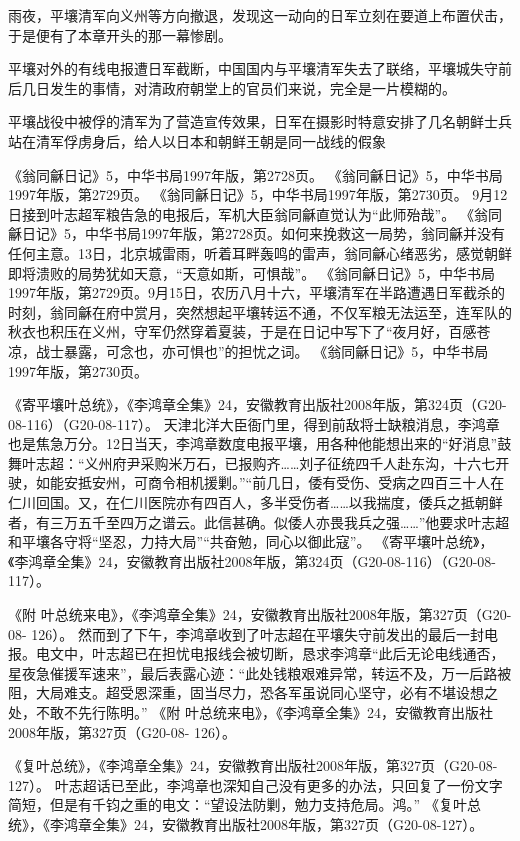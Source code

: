 \documentclass[12pt,UTF8]{ctexbook}
\begin{document}
雨夜，平壤清军向义州等方向撤退，发现这一动向的日军立刻在要道上布置伏击，于是便有了本章开头的那一幕惨剧。

平壤对外的有线电报遭日军截断，中国国内与平壤清军失去了联络，平壤城失守前后几日发生的事情，对清政府朝堂上的官员们来说，完全是一片模糊的。


平壤战役中被俘的清军为了营造宣传效果，日军在摄影时特意安排了几名朝鲜士兵站在清军俘虏身后，给人以日本和朝鲜王朝是同一战线的假象

《翁同龢日记》5，中华书局1997年版，第2728页。
《翁同龢日记》5，中华书局1997年版，第2729页。
《翁同龢日记》5，中华书局1997年版，第2730页。
9月12日接到叶志超军粮告急的电报后，军机大臣翁同龢直觉认为“此师殆哉”。 《翁同龢日记》5，中华书局1997年版，第2728页。如何来挽救这一局势，翁同龢并没有任何主意。13日，北京城雷雨，听着耳畔轰鸣的雷声，翁同龢心绪恶劣，感觉朝鲜即将溃败的局势犹如天意，“天意如斯，可惧哉”。 《翁同龢日记》5，中华书局1997年版，第2729页。9月15日，农历八月十六，平壤清军在半路遭遇日军截杀的时刻，翁同龢在府中赏月，突然想起平壤转运不通，不仅军粮无法运至，连军队的秋衣也积压在义州，守军仍然穿着夏装，于是在日记中写下了“夜月好，百感苍凉，战士暴露，可念也，亦可惧也”的担忧之词。 《翁同龢日记》5，中华书局1997年版，第2730页。

《寄平壤叶总统》，《李鸿章全集》24，安徽教育出版社2008年版，第324页（G20-08-116）（G20-08-117）。
天津北洋大臣衙门里，得到前敌将士缺粮消息，李鸿章也是焦急万分。12日当天，李鸿章数度电报平壤，用各种他能想出来的“好消息”鼓舞叶志超：“义州府尹采购米万石，已报购齐……刘子征统四千人赴东沟，十六七开驶，如能安抵安州，可商令相机援剿。”“前几日，倭有受伤、受病之四百三十人在仁川回国。又，在仁川医院亦有四百人，多半受伤者……以我揣度，倭兵之抵朝鲜者，有三万五千至四万之谱云。此信甚确。似倭人亦畏我兵之强……”他要求叶志超和平壤各守将“坚忍，力持大局”“共奋勉，同心以御此寇”。 《寄平壤叶总统》，《李鸿章全集》24，安徽教育出版社2008年版，第324页（G20-08-116）（G20-08-117）。

《附 叶总统来电》，《李鸿章全集》24，安徽教育出版社2008年版，第327页（G20-08- 126）。
然而到了下午，李鸿章收到了叶志超在平壤失守前发出的最后一封电报。电文中，叶志超已在担忧电报线会被切断，恳求李鸿章“此后无论电线通否，星夜急催援军速来”，最后表露心迹：“此处钱粮艰难异常，转运不及，万一后路被阻，大局难支。超受恩深重，固当尽力，恐各军虽说同心坚守，必有不堪设想之处，不敢不先行陈明。” 《附 叶总统来电》，《李鸿章全集》24，安徽教育出版社2008年版，第327页（G20-08- 126）。

《复叶总统》，《李鸿章全集》24，安徽教育出版社2008年版，第327页（G20-08-127）。
叶志超话已至此，李鸿章也深知自己没有更多的办法，只回复了一份文字简短，但是有千钧之重的电文：“望设法防剿，勉力支持危局。鸿。” 《复叶总统》，《李鸿章全集》24，安徽教育出版社2008年版，第327页（G20-08-127）。
\end{document}
